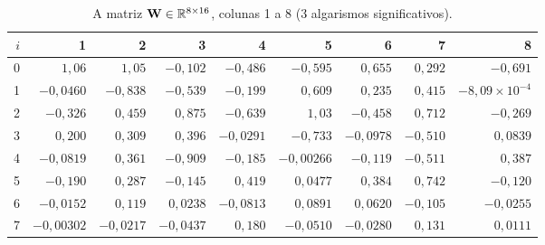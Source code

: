 \documentclass[11pt,a4paper]{article}
\begin{document}
\begin{table}[H]
\centering
\caption{A matriz $\mathbf{W}\in\mathbb{R}^{8\times16}$, colunas 1 a 8 (3 algarismos significativos).}\label{tab:W0}
\footnotesize
\begin{tabular}{rrrrrrrrr}
\toprule
$i$ & 1 & 2 & 3 & 4 & 5 & 6 & 7 & 8 \\
\midrule
0 & $1,06$ & $1,05$ & $-0,102$ & $-0,486$ & $-0,595$ & $0,655$ & $0,292$ & $-0,691$ \\
1 & $-0,0460$ & $-0,838$ & $-0,539$ & $-0,199$ & $0,609$ & $0,235$ & $0,415$ & $-8,09\times 10^{-4}$ \\
2 & $-0,326$ & $0,459$ & $0,875$ & $-0,639$ & $1,03$ & $-0,458$ & $0,712$ & $-0,269$ \\
3 & $0,200$ & $0,309$ & $0,396$ & $-0,0291$ & $-0,733$ & $-0,0978$ & $-0,510$ & $0,0839$ \\
4 & $-0,0819$ & $0,361$ & $-0,909$ & $-0,185$ & $-0,00266$ & $-0,119$ & $-0,511$ & $0,387$ \\
5 & $-0,190$ & $0,287$ & $-0,145$ & $0,419$ & $0,0477$ & $0,384$ & $0,742$ & $-0,120$ \\
6 & $-0,0152$ & $0,119$ & $0,0238$ & $-0,0813$ & $0,0891$ & $0,0620$ & $-0,105$ & $-0,0255$ \\
7 & $-0,00302$ & $-0,0217$ & $-0,0437$ & $0,180$ & $-0,0510$ & $-0,0280$ & $0,131$ & $0,0111$ \\
\bottomrule
\end{tabular}
\par\vspace{2pt}{\footnotesize Fonte: elaborado pelo autor.}
\end{table}
\end{document}
